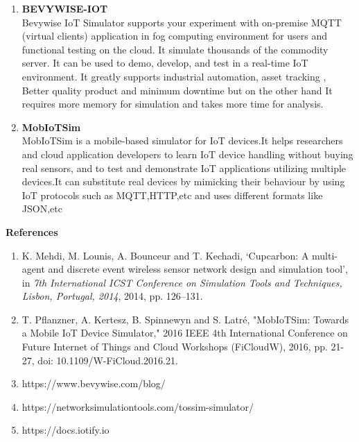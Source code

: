 \documentclass[a4paper,11pt]{article}
\begin{document}
\begin{iotsolution}
\begin{enumerate}[1]
\item{\textbf{BEVYWISE-IOT}}\\
Bevywise IoT Simulator supports your experiment with
on-premise MQTT (virtual clients) application in fog
computing environment for users and functional testing
on the cloud. It simulate thousands of the commodity server. It can
be used to demo, develop, and test in a real-time IoT
environment. It greatly supports industrial automation, asset tracking , Better quality product and minimum downtime but on the other hand It requires more memory for simulation and takes more time for analysis.

\item{\textbf{MobIoTSim}}\\
MobIoTSim is a mobile-based simulator for IoT devices.It helps researchers and cloud application
developers to learn IoT device handling without buying
real sensors, and to test and demonstrate IoT applications
utilizing multiple devices.It can substitute real devices by mimicking their behaviour by using IoT protocols such as MQTT,HTTP,etc and uses different formats like JSON,etc


\end{enumerate}
\vspace{1cm}
\textbf{References}
\begin{enumerate}[1]
    \item K. Mehdi, M. Lounis, A. Bounceur and T. Kechadi,
‘Cupcarbon: A multi-agent and discrete event wireless
sensor network design and simulation tool’, in \emph{7th
International ICST Conference on Simulation Tools and
Techniques, Lisbon, Portugal, 2014}, 2014, pp. 126–131.
    \item T. Pflanzner, A. Kertesz, B. Spinnewyn and S. Latré, "MobIoTSim: Towards a Mobile IoT Device Simulator," 2016 IEEE 4th International Conference on Future Internet of Things and Cloud Workshops (FiCloudW), 2016, pp. 21-27, doi: 10.1109/W-FiCloud.2016.21.
    \item https://www.bevywise.com/blog/
    \item https://networksimulationtools.com/tossim-simulator/
    \item https://docs.iotify.io
\end{enumerate}

\end{iotsolution}
\end{document}
